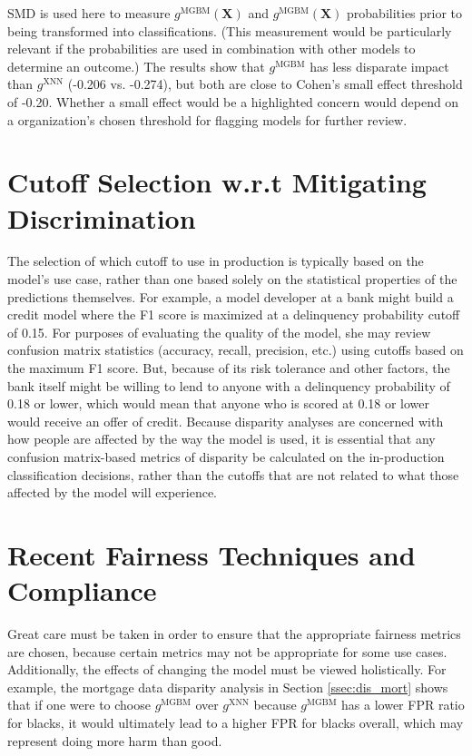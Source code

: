 \documentclass[information,article,submit,moreauthors,pdftex]{definitions/mdpi}
\begin{document}
\noindent SMD is used here to measure $g^\text{MGBM}(\mathbf{X})$ and $g^\text{MGBM}(\mathbf{X})$ probabilities prior to being transformed into classifications.  (This measurement would be particularly relevant if the probabilities are used in combination with other models to determine an outcome.)  The results show that $g^\text{MGBM}$ has less disparate impact than $g^\text{XNN}$ (-0.206 vs. -0.274), but both are close to Cohen’s small effect threshold of -0.20. Whether a small effect would be a highlighted concern would depend on a organization’s chosen threshold for flagging models for further review. 

\section{Cutoff Selection w.r.t Mitigating Discrimination}\label{a_sec:cut}

The selection of which cutoff to use in production is typically based on the model’s use case, rather than one based solely on the statistical properties of the predictions themselves.  For example, a model developer at a bank might build a credit model where the F1 score is maximized at a delinquency probability cutoff of 0.15.  For purposes of evaluating the quality of the model, she may review confusion matrix statistics (accuracy, recall, precision, etc.) using cutoffs based on the maximum F1 score. But, because of its risk tolerance and other factors, the bank itself might be willing to lend to anyone with a delinquency probability of 0.18 or lower, which would mean that anyone who is scored at 0.18 or lower would receive an offer of credit.  Because disparity analyses are concerned with how people are affected by the way the model is used, it is essential that any confusion matrix-based metrics of disparity be calculated on the in-production classification decisions, rather than the cutoffs that are not related to what those affected by the model will experience.

\section{Recent Fairness Techniques and Compliance}\label{a_sec:comp}

Great care must be taken in order to ensure that the appropriate fairness metrics are chosen, because certain metrics may not be appropriate for some use cases. Additionally, the effects of changing the model must be viewed holistically.  For example, the mortgage data disparity analysis in Section \ref{ssec:dis_mort} shows that if one were to choose $g^\text{MGBM}$ over $g^\text{XNN}$ because $g^\text{MGBM}$ has a lower FPR ratio for blacks, it would ultimately lead to a higher FPR for blacks overall, which may represent doing more harm than good.
\end{document}
